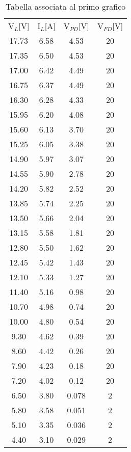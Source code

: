 \documentclass{article}
\begin{document}
\begin{table}[h!]
  \begin{center}
   \begin{tabular}{|c|c|c|c|}
      V$_{L}$[V]&I$_{L}$[A]&V$_{PD}$[V]&V$_{FD}$[V]\\
      17.73&6.58&4.53&20\\
      17.35&6.50&4.53&20\\
      17.00&6.42&4.49&20\\
      16.75&6.37&4.49&20\\
      16.30&6.28&4.33&20\\
      15.95&6.20&4.08&20\\
      15.60&6.13&3.70&20\\
      15.25&6.05&3.38&20\\
      14.90&5.97&3.07&20\\
      14.55&5.90&2.78&20\\
      14.20&5.82&2.52&20\\
      13.85&5.74&2.25&20\\
      13.50&5.66&2.04&20\\
      13.15&5.58&1.81&20\\
      12.80&5.50&1.62&20\\
      12.45&5.42&1.43&20\\
      12.10&5.33&1.27&20\\
      11.40&5.16&0.98&20\\
      10.70&4.98&0.74&20\\
      10.00&4.80&0.54&20\\
      9.30&4.62&0.39&20\\
      8.60&4.42&0.26&20\\
      7.90&4.23&0.18&20\\
      7.20&4.02&0.12&20\\
      6.50&3.80&0.078&2\\
      5.80&3.58&0.051&2\\
      5.10&3.35&0.036&2\\
      4.40&3.10&0.029&2\\
   \end{tabular}
  \caption{Tabella associata al primo grafico}
  \end{center}
\end{table}
 
\end{document}
